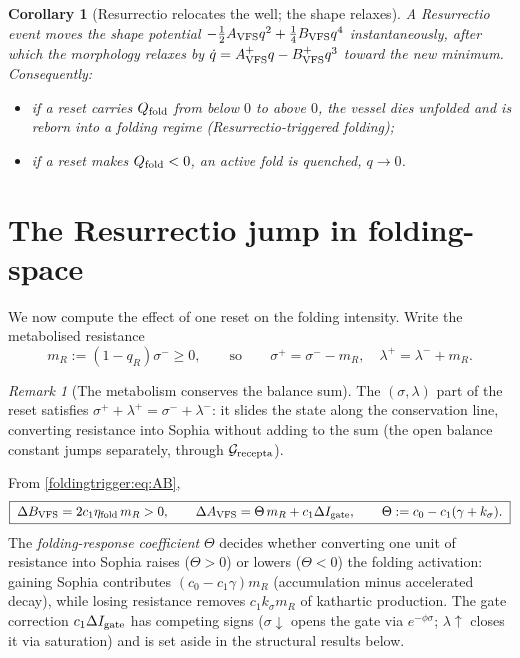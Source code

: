 \documentclass[11pt,a4paper,oneside]{book}
\newcommand{\Grec}{\mathcal G_{\rm recepta}}
\newcommand{\Igate}{I_{\rm gate}}
\newcommand{\Avfs}{A_{\rm VFS}}
\newcommand{\Bvfs}{B_{\rm VFS}}
\newcommand{\Qf}{Q_{\rm fold}}
\newcommand{\etaf}{\eta_{\rm fold}}
\theoremstyle{plain}
\newtheorem{corollary}{Corollary}[chapter]
\theoremstyle{definition}
\theoremstyle{remark}
\newtheorem*{remark}{Remark}
\begin{document}
\begin{corollary}[Resurrectio relocates the well; the shape relaxes]\label{foldingtrigger:cor:well}
A Resurrectio event moves the shape potential $-\tfrac12\Avfs q^2+\tfrac14\Bvfs q^4$ instantaneously, after
which the morphology relaxes by $\dot q=\Avfs^{+}q-\Bvfs^{+}q^3$ toward the new minimum. Consequently:
\begin{itemize}[leftmargin=1.4em,itemsep=2pt]
\item if a reset carries $\Qf$ from below $0$ to above $0$, the vessel dies unfolded and is reborn into a
folding regime (\emph{Resurrectio-triggered folding});
\item if a reset makes $\Qf<0$, an active fold is quenched, $q\to0$.
\end{itemize}
\end{corollary}

\section{The Resurrectio jump in folding-space}\label{foldingtrigger:sec:jump}

We now compute the effect of one reset on the folding intensity. Write the metabolised resistance
\begin{equation}
m_R:=(1-q_R)\sigma^-\ge0,
\qquad\text{so}\qquad
\sigma^+=\sigma^--m_R,\quad \lambda^+=\lambda^-+m_R.
\end{equation}

\begin{remark}[The metabolism conserves the balance sum]
The $(\sigma,\lambda)$ part of the reset satisfies $\sigma^++\lambda^+=\sigma^-+\lambda^-$: it slides the
state along the conservation line, converting resistance into Sophia without adding to the sum (the open
balance constant jumps separately, through $\Grec$).
\end{remark}

From \eqref{foldingtrigger:eq:AB},
\begin{equation}
\boxed{\;\Delta\Bvfs=2c_1\etaf\,m_R>0,
\qquad
\Delta\Avfs=\Theta\,m_R+c_1\Delta\Igate,
\qquad
\Theta:=c_0-c_1(\gamma+k_\sigma).\;}
\end{equation}
The \emph{folding-response coefficient} $\Theta$ decides whether converting one unit of resistance into
Sophia raises ($\Theta>0$) or lowers ($\Theta<0$) the folding activation: gaining Sophia contributes
$(c_0-c_1\gamma)m_R$ (accumulation minus accelerated decay), while losing resistance removes
$c_1k_\sigma m_R$ of kathartic production. The gate correction $c_1\Delta\Igate$ has competing signs
($\sigma\!\downarrow$ opens the gate via $e^{-\phi\sigma}$; $\lambda\!\uparrow$ closes it via saturation)
and is set aside in the structural results below.
\end{document}
